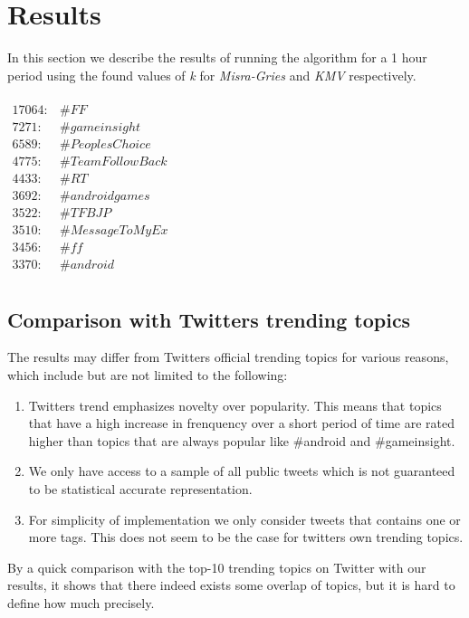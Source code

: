 \section{Results}\label{results}
In this section we describe the results of running the algorithm for a 1 hour period using the found values of \textit{k} for \textit{Misra-Gries} and \textit{KMV} respectively.
\\\\
$\begin{array}{ll}
    17064: & \#FF \\
    7271: & \#gameinsight \\
    6589: & \#PeoplesChoice \\
    4775: & \#TeamFollowBack \\
    4433: & \#RT \\
    3692: & \#androidgames \\
    3522: & \#TFBJP \\
    3510: & \#MessageToMyEx \\
    3456: & \#ff \\
    3370: & \#android \\
\end{array}$

\subsection{Comparison with Twitters trending topics}\label{twitter-result}
The results may differ from Twitters official trending topics for various reasons, which include but are not limited to the following: 
\\
\begin{enumerate}
	\item Twitters trend emphasizes novelty over popularity. This means that topics that have a high increase in frenquency over a short period of time are rated higher than topics that are always popular like \#android and \#gameinsight. 
	\item We only have access to a sample of all public tweets which is not guaranteed to be statistical accurate representation.
    \item For simplicity of implementation we only consider tweets that contains one or more tags. This does not seem to be the case for twitters own trending topics.
\end{enumerate}

By a quick comparison with the top-10 trending topics on Twitter with our results, it shows that there indeed exists some overlap of topics, but it is hard to define how much precisely.


